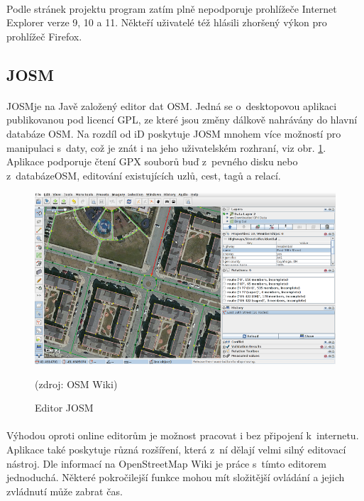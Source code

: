 \documentclass[11pt,a4paper,titlepage,oneside]{book}
\begin{document}
			\paragraph{} Podle stránek projektu\cite{wiki_iD} program zatím plně nepodporuje prohlížeče Internet Explorer verze 9, 10 a 11. Někteří uživatelé též hlásili zhoršený výkon pro prohlížeč Firefox.

		\subsection{JOSM}
			\paragraph{}\ac{JOSM}je na Javě založený editor dat \ac{OSM}. Jedná se o~desktopovou aplikaci publikovanou pod licencí \ac{GPL}, ze které jsou změny dálkově nahrávány do hlavní databáze \ac{OSM}\cite{wiki_josm}. Na rozdíl od iD poskytuje JOSM mnohem více možností pro manipulaci s~daty\cite{wiki_comparison}, což je znát i na jeho uživatelském rozhraní, viz obr. \ref{fig:josm_osm}. Aplikace podporuje čtení \ac{GPX} souborů buď z~pevného disku nebo z~databáze\acl{OSM}, editování existujících uzlů, cest, tagů a relací.


		\begin{figure}[!h]
			\begin{center}
				\includegraphics[width=12.6cm]{obrazky/josm_osm.png}
				\caption{Editor JOSM} (zdroj: OSM Wiki\cite{wiki_josm})
				\label{fig:josm_osm}
			\end{center}
		\end{figure}
			\paragraph{} Výhodou oproti online editorům je možnost pracovat i bez připojení k~internetu. Aplikace také poskytuje různá rozšíření, která z~ní dělají velmi silný editovací nástroj. Dle informací na OpenStreetMap Wiki\cite{wiki_josm} je práce s~tímto editorem jednoduchá. Některé pokročilejší funkce mohou mít složitější ovlá\-dání a jejich zvládnutí může zabrat čas.
\end{document}
